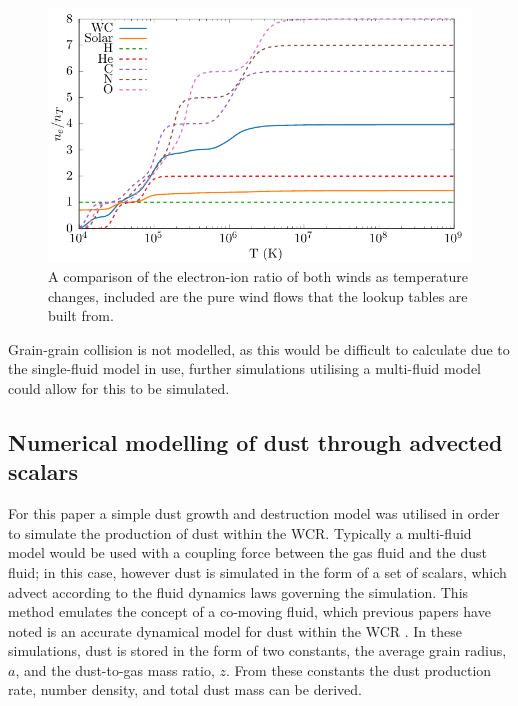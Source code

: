 \begin{figure}[h]
  \centering
  \includegraphics{assets/ionisation-fraction/ionisation-fraction.pdf}
  \caption[OB and WR electron-ion ratios]{A comparison of the electron-ion ratio of both winds as temperature changes, included are the pure wind flows that the lookup tables are built from.}
  \label{fig:electron-curve}
\end{figure}

Grain-grain collision is not modelled, as this would be difficult to calculate due to the single-fluid model in use, further simulations utilising a multi-fluid model could allow for this to be simulated.



\subsection{Numerical modelling of dust through advected scalars}

For this paper a simple dust growth and destruction model was utilised in order to simulate the production of dust within the WCR. Typically a multi-fluid model would be used with a coupling force between the gas fluid and the dust fluid; in this case, however dust is simulated in the form of a set of scalars, which advect according to the fluid dynamics laws governing the simulation. This method emulates the concept of a co-moving fluid, which previous papers have noted is an accurate dynamical model for dust within the WCR \parencite{hendrix_pinwheels_2016}. In these simulations, dust is stored in the form of two constants, the average grain radius, $a$, and the dust-to-gas mass ratio, $z$. From these constants the dust production rate, number density, and total dust mass can be derived.

